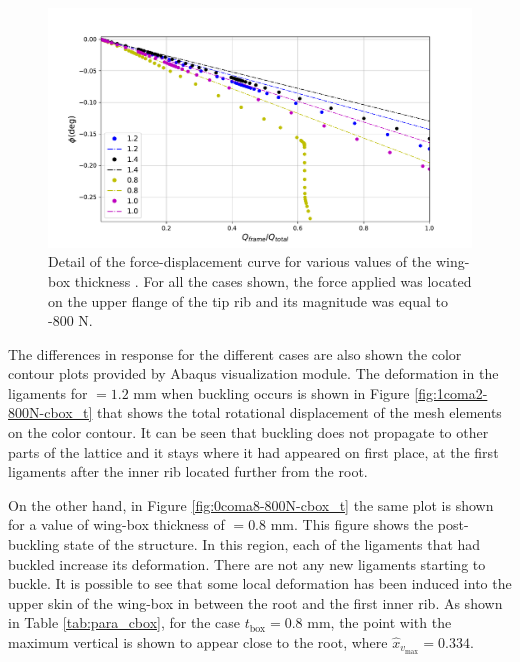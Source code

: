     \begin{figure}[!htpb] %
      \centering
      \includegraphics[width=0.8 \textwidth]{../figures/result-sim/cbox/force_displacement-close}
      \caption[Detail of the force-displacement curve for various values of the wing-box thickness]{Detail of the force-displacement curve for various values of the wing-box thickness \boxt. For all the cases shown, the force applied was located on the upper flange of the tip rib and its magnitude was equal to -800 N.}\label{fig:forceDisplacement-close-Cbox_t}
    \end{figure}

    The differences in response for the different cases are also shown the color contour plots provided by Abaqus visualization module. The deformation in the ligaments for \boxt$= 1.2$ mm when buckling occurs is shown in Figure \ref{fig:1coma2-800N-cbox_t} that shows the total rotational displacement of the mesh elements on the color contour. It can be seen that buckling does not propagate to other parts of the lattice and it stays where it had appeared on first place, at the first ligaments after the inner rib located further from the root.

    On the other hand, in Figure \ref{fig:0coma8-800N-cbox_t} the same plot is shown for a value of wing-box thickness of \boxt$= 0.8$ mm. This figure shows the post-buckling state of the structure. In this region, each of the ligaments that had buckled increase its deformation. There are not any new ligaments starting to buckle. It is possible to see that some local deformation has been induced into the upper skin of the wing-box in between the root and the first inner rib. As shown in Table \ref{tab:para_cbox}, for the case $t_{\mathrm{box}} = 0.8$ mm, the point with the maximum vertical is shown to appear close to the root, where $\hat{x}_{v_{\mathrm{max}}} = 0.334$.

